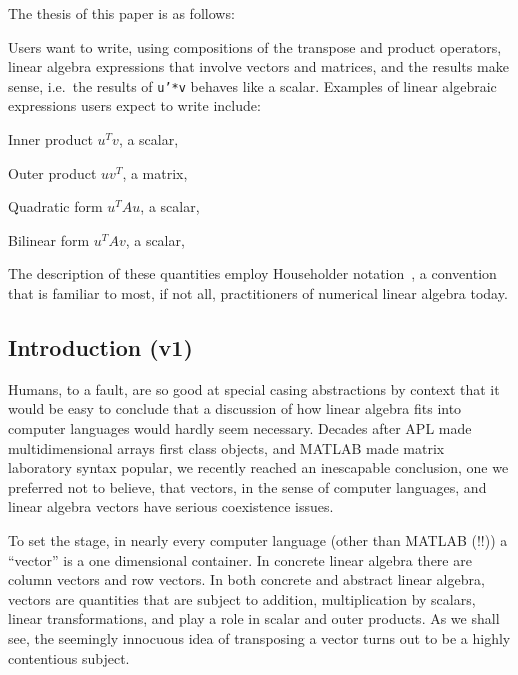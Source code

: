 The thesis of this paper is as follows:

Users want to write, using compositions of the transpose and product operators,
linear algebra expressions that involve vectors and matrices, and the results
make sense, i.e.\ the results of \texttt{u'*v} behaves like a scalar. Examples of
linear algebraic expressions users expect to write include:

\begin{description}

\item{Inner product} $u^T v$, a scalar,
\item{Outer product} $u v^T$, a matrix,
\item{Quadratic form} $u^T A u$, a scalar,
\item{Bilinear form} $u^T A v$, a scalar,

\end{description}

The description of these quantities employ Householder
notation~\cite{Householder1953,Householder1955}, a convention that is familiar
to most, if not all, practitioners of numerical linear algebra today.



\subsection{Introduction (v1)}

Humans, to a fault, are so good at special casing abstractions
by context that it would be easy to conclude that a discussion
of how linear algebra fits into computer languages would hardly
seem necessary.  Decades after APL made multidimensional
arrays first class objects, and MATLAB made matrix laboratory
syntax popular,  we recently  reached an inescapable conclusion,
one we preferred not to believe, that
vectors, in the sense of computer languages,
and linear algebra vectors have serious coexistence issues.



To set the stage, in nearly every computer language (other than MATLAB (!!)) a
``vector'' is a one dimensional container. In concrete linear algebra there
are column vectors and row vectors. In both concrete and abstract linear
algebra, vectors are quantities that are subject to addition, multiplication by
scalars, linear transformations, and play a role in scalar and outer products.
As we shall see, the seemingly innocuous idea of transposing a vector turns
out to be a highly contentious subject.


